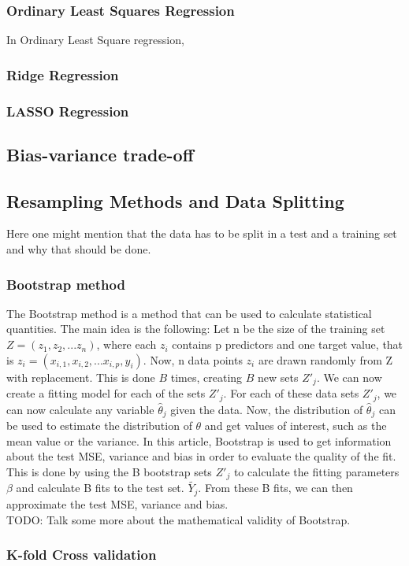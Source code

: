 \documentclass[11pt,a4paper]{article}
\begin{document}
\subsubsection{Ordinary Least Squares Regression}
In Ordinary Least Square regression,
\subsubsection{Ridge Regression}
\subsubsection{LASSO Regression}
\subsection{Bias-variance trade-off}
\subsection{Resampling Methods and Data Splitting}
Here one might mention that the data has to be split in a test and a training set and why that should be done.
\subsubsection{Bootstrap method}
The Bootstrap method is a method that can be used to calculate statistical quantities. The main idea is the following: Let n be the size of the training set $Z=(z_1,z_2,...z_n)$, where each $z_i$ contains p predictors and one target value, that is $z_i=(x_{i,1},x_{i,2},...x_{i,p},y_i)$. Now, n data points $z_i$ are drawn randomly from Z with replacement. This is done $B$ times, creating $B$ new sets $Z'_j$. We can now create a fitting model for each of the sets  $Z'_j$. For each of these data sets $Z'_j$, we can now calculate any variable $\hat\theta_j$ given the data. Now, the distribution of $\hat\theta_j$ can be used to estimate the distribution of $\theta$ and get values of interest, such as the mean value or the variance. In this article, Bootstrap is used to get information about the test MSE, variance and bias in order to evaluate the quality of the fit. This is done by using the B bootstrap sets $Z'_j$ to calculate the fitting parameters $\beta$ and calculate B fits to the test set. $\tilde{Y_j}$. From these B fits, we can then approximate the test MSE, variance and bias.\\
TODO: Talk some more about the mathematical validity of Bootstrap.
\subsubsection{K-fold Cross validation}
\end{document}
